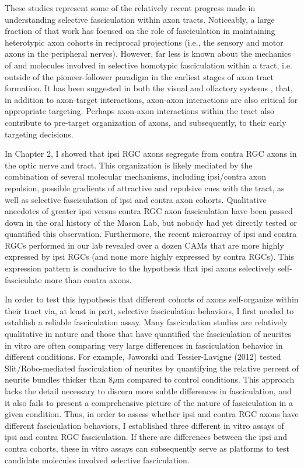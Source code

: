 These studies represent some of the relatively recent progress made in understanding selective fasciculation within axon tracts.
Noticeably, a large fraction of that work has focused on the role of fasciculation in maintaining heterotypic axon cohorts in reciprocal projections (i.e., the sensory and motor axons in the peripheral nerves).
However, far less is known about the mechanics of and molecules involved in selective homotypic fasciculation within a tract, i.e. outside of the pioneer-follower paradigm in the earliest stages of axon tract formation.
It has been suggested in both the visual \cite{weth2014chemoaffinity} and olfactory systems \cite{ebrahimi2000olfactory,imai2011axon}, that, in addition to axon-target interactions, axon-axon interactions are also critical for appropriate targeting.
Perhaps axon-axon interactions within the tract also contribute to pre-target organization of axons, and subsequently, to their early targeting decisions.

In Chapter 2, I showed that ipsi RGC axons segregate from contra RGC axons in the optic nerve and tract.
This organization is likely mediated by the combination of several molecular mechanisms, including ipsi/contra axon repulsion, possible gradients of attractive and repulsive cues with the tract, as well as selective fasciculation of ipsi and contra axon cohorts.
Qualitative anecdotes of greater ipsi versus contra RGC axon fasciculation have been passed down in the oral history of the Mason Lab, but nobody had yet directly tested or quantified this observation.
Furthermore, the recent microarray of ipsi and contra RGCs performed in our lab revealed over a dozen CAMs that are more highly expressed by ipsi RGCs (and none more highly expressed by contra RGCs).
This expression pattern is conducive to the hypothesis that ipsi axons selectively self-fasciculate more than contra axons.

In order to test this hypothesis that different cohorts of axons self-organize within their tract via, at least in part, selective fasciculation behaviors, I first needed to establish a reliable fasciculation assay.
Many fasciculation studies are relatively qualitative in nature and those that have quantified the fasciculation of neurites in vitro are often comparing very large differences in fasciculation behavior in different conditions.
For example, Jaworski and Tessier-Lavigne (2012) tested Slit/Robo-mediated fasciculation of neurites by quantifying the relative percent of neurite bundles thicker than 8$\mu$m compared to control conditions.
This approach lacks the detail necessary to discern more subtle differences in fasciculation, and it also fails to present a comprehensive picture of the nature of fasciculation in a given condition. 
Thus, in order to assess whether ipsi and contra RGC axons have different fasciculation behaviors, I established three different in vitro assays of ipsi and contra RGC fasciculation.
If there are differences between the ipsi and contra cohorts, these in vitro assays can subsequently serve as platforms to test candidate molecules involved selective fasciculation.